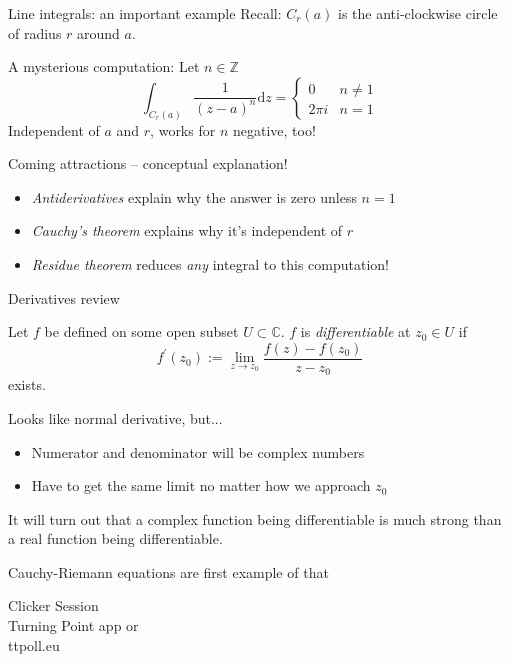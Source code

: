 \documentclass{beamer}
\newcommand{\C}{\mathbb{C}}
\newcommand{\Z}{\mathbb{Z}}
\begin{document}
\begin{frame}{Line integrals: an important example}
Recall: $C_r(a)$ is the anti-clockwise circle of radius $r$ around $a$.  
\begin{block}{A mysterious computation:}
Let $n\in\Z$
$$\int_{C_r(a)}\frac{1}{(z-a)^n}\text{d}z=\begin{cases} 0 & n\neq 1 \\ 2\pi i & n=1\end{cases}$$
Independent of $a$ and $r$, works for $n$ negative, too!
\end{block}
\begin{block}{Coming attractions -- conceptual explanation!}
\begin{itemize}
    \item \emph{Antiderivatives} explain why the answer is zero unless $n=1$
    \item \emph{Cauchy's theorem} explains why it's independent of $r$
    \item \emph{Residue theorem} reduces \emph{any} integral to this computation!
\end{itemize}
\end{block}
\end{frame}
\begin{frame}{Derivatives review}
\begin{definition} Let $f$ be defined on some open subset $U\subset \C$.  $f$ is \emph{differentiable} at $z_0\in U$ if
$$f^\prime(z_0):=\lim_{z\to z_0}\frac{f(z)-f(z_0)}{z-z_0}$$ 
exists.
\end{definition}
\begin{block}{Looks like normal derivative, but...}
\begin{itemize}
    \item Numerator and denominator will be complex numbers
    \item Have to get the same limit no matter how we approach $z_0$
\end{itemize}
It will turn out that a complex function being differentiable is much strong than a real function being differentiable.
\end{block}
\begin{block}{Cauchy-Riemann equations are first example of that}
\end{block}
\end{frame}



\begin{frame}
  
\begin{center}

\Huge

Clicker Session \\
Turning Point app or \\
ttpoll.eu 

\end{center}

\end{frame}
\end{document}
